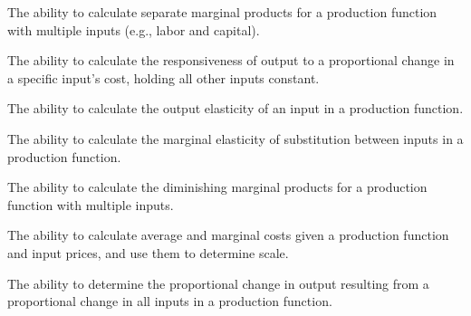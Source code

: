 \begin{el}
    {The ability to calculate separate marginal products for a production function with multiple inputs (e.g., labor and capital).}
\end{el}

\begin{el}\label{el:input_elasticity}
    {The ability to calculate the responsiveness of output to a proportional change in a specific input's cost, holding all other inputs constant.}
\end{el}

\begin{el}\label{el:output_elasticity}
    {The ability to calculate the output elasticity of an input in a production function.}
\end{el}

\begin{el}
    {The ability to calculate the marginal elasticity of substitution between inputs in a production function.}
\end{el}

\begin{el}\label{el:diminishing_marginal_product}
    {The ability to calculate the diminishing marginal products for a production function with multiple inputs.}
\end{el}

\begin{el}\label{el:average_cost}
    {The ability to calculate average and marginal costs given a production function and input prices, and use them to determine scale.}
\end{el}

\begin{el}\label{el:returns_to_scale}
    {The ability to determine the proportional change in output resulting from a proportional change in all inputs in a production function.}
\end{el}


